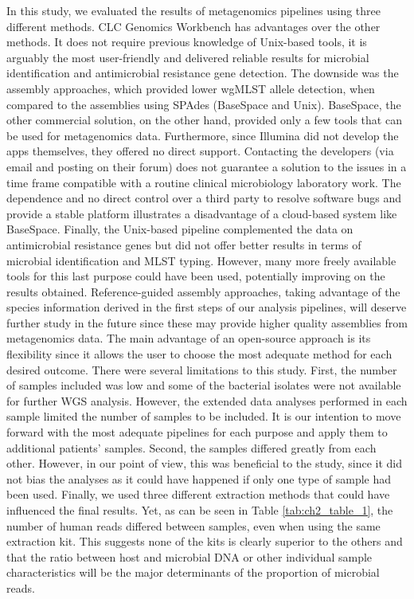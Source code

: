 In this study, we evaluated the results of metagenomics pipelines using three different methods. CLC Genomics Workbench has advantages over the other methods. It does not require previous knowledge of Unix-based tools, it is arguably the most user-friendly and delivered reliable results for microbial identification and antimicrobial resistance gene detection. The downside was the assembly approaches, which provided lower wgMLST allele detection, when compared to the assemblies using SPAdes (BaseSpace and Unix). BaseSpace, the other commercial solution, on the other hand, provided only a few tools that can be used for metagenomics data. Furthermore, since Illumina did not develop the apps themselves, they offered no direct support. Contacting the developers (via email and posting on their forum) does not guarantee a solution to the issues in a time frame compatible with a routine clinical microbiology laboratory work. The dependence and no direct control over a third party to resolve software bugs and provide a stable platform illustrates a disadvantage of a cloud-based system like BaseSpace. Finally, the Unix-based pipeline complemented the data on antimicrobial resistance genes but did not offer better results in terms of microbial identification and MLST typing. However, many more freely available tools for this last purpose could have been used, potentially improving on the results obtained. Reference-guided assembly approaches, taking advantage of the species information derived in the first steps of our analysis pipelines, will deserve further study in the future since these may provide higher quality assemblies from metagenomics data. The main advantage of an open-source approach is its flexibility since it allows the user to choose the most adequate method for each desired outcome.
There were several limitations to this study. First, the number of samples included was low and some of the bacterial isolates were not available for further \ac{WGS} analysis. However, the extended data analyses performed in each sample limited the number of samples to be included. It is our intention to move forward with the most adequate pipelines for each purpose and apply them to additional patients’ samples. Second, the samples differed greatly from each other. However, in our point of view, this was beneficial to the study, since it did not bias the analyses as it could have happened if only one type of sample had been used. Finally, we used three different extraction methods that could have influenced the final results. Yet, as can be seen in Table \ref{tab:ch2_table_1}, the number of human reads differed between samples, even when using the same extraction kit. This suggests none of the kits is clearly superior to the others and that the ratio between host and microbial DNA or other individual sample characteristics will be the major determinants of the proportion of microbial reads.

